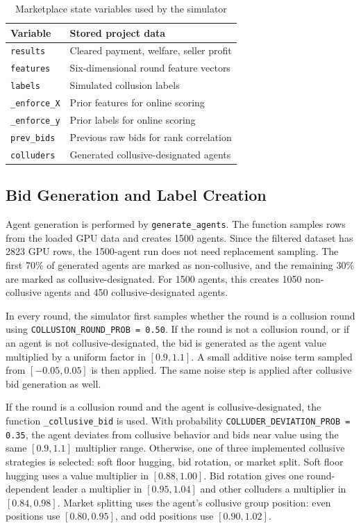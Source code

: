 \documentclass[conference]{IEEEtran}
\begin{document}
\begin{table}[htbp]
\caption{Marketplace state variables used by the simulator}
\label{tab:statevars}
\centering
\begin{tabular}{ll}
\toprule
\textbf{Variable} & \textbf{Stored project data} \\
\midrule
\texttt{results} & Cleared payment, welfare, seller profit \\
\texttt{features} & Six-dimensional round feature vectors \\
\texttt{labels} & Simulated collusion labels \\
\texttt{\_enforce\_X} & Prior features for online scoring \\
\texttt{\_enforce\_y} & Prior labels for online scoring \\
\texttt{prev\_bids} & Previous raw bids for rank correlation \\
\texttt{colluders} & Generated collusive-designated agents \\
\bottomrule
\end{tabular}
\end{table}

\subsection{Bid Generation and Label Creation}
Agent generation is performed by \texttt{generate\_agents}. The function samples rows from the loaded GPU data and creates 1500 agents. Since the filtered dataset has 2823 GPU rows, the 1500-agent run does not need replacement sampling. The first 70\% of generated agents are marked as non-collusive, and the remaining 30\% are marked as collusive-designated. For 1500 agents, this creates 1050 non-collusive agents and 450 collusive-designated agents.

In every round, the simulator first samples whether the round is a collusion round using \texttt{COLLUSION\_ROUND\_PROB = 0.50}. If the round is not a collusion round, or if an agent is not collusive-designated, the bid is generated as the agent value multiplied by a uniform factor in $[0.9,1.1]$. A small additive noise term sampled from $[-0.05,0.05]$ is then applied. The same noise step is applied after collusive bid generation as well.

If the round is a collusion round and the agent is collusive-designated, the function \texttt{\_collusive\_bid} is used. With probability \texttt{COLLUDER\_DEVIATION\_PROB = 0.35}, the agent deviates from collusive behavior and bids near value using the same $[0.9,1.1]$ multiplier range. Otherwise, one of three implemented collusive strategies is selected: soft floor hugging, bid rotation, or market split. Soft floor hugging uses a value multiplier in $[0.88,1.00]$. Bid rotation gives one round-dependent leader a multiplier in $[0.95,1.04]$ and other colluders a multiplier in $[0.84,0.98]$. Market splitting uses the agent's collusive group position: even positions use $[0.80,0.95]$, and odd positions use $[0.90,1.02]$.
\end{document}
